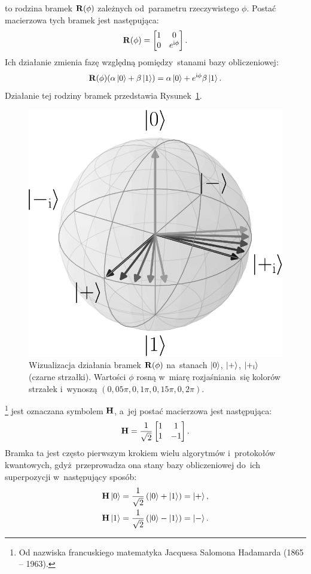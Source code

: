 to rodzina bramek $\mathbf{R}(\phi)$ zależnych od~parametru rzeczywistego $\phi$.
Postać macierzowa tych bramek jest następująca:
$$\mathbf{R}(\phi) = \begin{bmatrix} 1 & 0 \\ 0 & e^{{\mathrm i} \phi} \end{bmatrix}.$$
Ich działanie zmienia fazę względną pomiędzy~stanami bazy obliczeniowej:
$$\mathbf{R}(\phi) (\alpha\ket{0} + \beta\ket{1}) = \alpha\ket{0} +  e^{{\mathrm i} \phi} \beta\ket{1}.$$
Działanie tej rodziny bramek przedstawia Rysunek~\ref{rys:bramka-Rphi}.

\begin{figure}[h]
	\centering
	\includegraphics[width=0.45\linewidth]{pics/Rphi}
	\caption{Wizualizacja działania bramek $\mathbf{R}(\phi)$ na~stanach
	$\ket{0}$, $\ket{+}$, $\ket{+_{\mathrm i}}$ (czarne strzałki).
	Wartości $\phi$ rosną w~miarę rozjaśniania~się kolorów strzałek i~wynoszą
	$(0{,}05\pi,0{,}1\pi,0{,}15\pi,0{,}2\pi)$.}
	\label{rys:bramka-Rphi}
\end{figure}

\footnote{Od nazwiska francuskiego matematyka
	Jacquesa Salomona Hadamarda (1865 -- 1963).}
jest
oznaczana symbolem $\mathbf{H}$, a~jej postać macierzowa jest następująca:
$$\mathbf{H}=\frac{1}{\sqrt{2}} \begin{bmatrix} 1 & 1 \\ 1 & -1\end{bmatrix}.$$
Bramka ta jest często pierwszym krokiem wielu algorytmów i~protokołów
kwantowych, gdyż~przeprowadza ona stany bazy obliczeniowej
do~ich superpozycji w~następujący sposób:
$$
	\begin{aligned}
		\mathbf{H}\ket{0} = \frac{1}{\sqrt{2}}\left( \ket{0} +\ket{1} \right)=\ket{+}, \\
		\mathbf{H}\ket{1} = \frac{1}{\sqrt{2}}\left( \ket{0} -\ket{1} \right)=\ket{-}.
	\end{aligned}
$$

